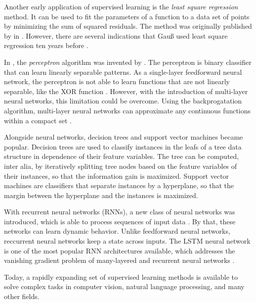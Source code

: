 Another early application of supervised learning is the \textit{least square regression} method.
It can be used to fit the parameters of a function to a data set of points by minimizing the sum of squared residuals.
The method was originally published by \citeauthor{legendre1805nouvelles} in \citeyear{legendre1805nouvelles} \cite{legendre1805nouvelles}.
However, there are several indications that Gauß used least square regression ten years before \citeauthor{legendre1805nouvelles} \cite{stigler1981gauss}.

In \citeyear{rosenblatt1957perceptron}, the \textit{perceptron} algorithm was invented by \citeauthor{rosenblatt1957perceptron} \cite{rosenblatt1957perceptron}.
The perceptron is binary classifier that can learn linearly separable patterns.
As a single-layer feedforward neural network, the perceptron is not able to learn functions that are not linearly separable, like the XOR function \cite{minsky2017perceptrons}.
However, with the introduction of multi-layer neural networks, this limitation could be overcome.
Using the backprogatation algorithm, multi-layer neural networks can approximate any continuous functions within a compact set \cite{DBLP:journals/mcss/Cybenko89}.

Alongside neural networks, decision trees \cite{DBLP:journals/ml/Quinlan86} and support vector machines \cite{DBLP:journals/ml/CortesV95} became popular.
Decision trees are used to classify instances in the leafs of a tree data structure in dependence of their feature variables.
The tree can be computed, inter alia, by iteratively splitting tree nodes based on the feature variables of their instances, so that the information gain is maximized.
Support vector machines are classifiers that separate instances by a hyperplane, so that the margin between the hyperplane and the instances is maximized.

With recurrent neural networks (RNNs), a new class of neural networks was introduced, which is able to process sequences of input data \cite{rumelhart1985learning}.
By that, these networks can learn dynamic behavior.
Unlike feedforward neural networks, reccurrent neural networks keep a state across inputs.
The LSTM neural network is one of the most popular RNN architectures available, which addresses the vanishing gradient problem of many-layered and recurrent neural networks \cite{DBLP:journals/neco/HochreiterS97}.

Today, a rapidly expanding set of supervised learning methods is available to solve complex tasks in computer vision, natural language processing, and many other fields.